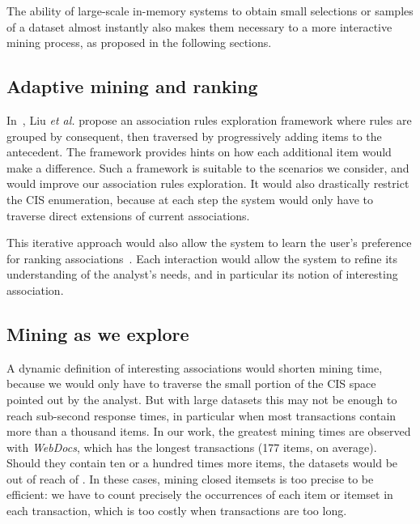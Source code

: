 The ability of large-scale in-memory systems to obtain small selections or samples of a dataset
almost instantly also makes them necessary to a more interactive mining process,
as proposed in the following sections.



%



\subsection{Adaptive mining and ranking}
\label{sec:evolutions:adaptative}

In~\cite{LiuICDE11}, Liu \textit{et al.} propose an association rules exploration framework
where rules are grouped by consequent,
then traversed by progressively adding items to the antecedent.
The framework provides hints on how each additional item would make a difference.
Such a framework is suitable to the scenarios we consider,
and would improve our association rules exploration.
It would also drastically restrict the CIS enumeration,
because at each step the system would only have to traverse direct extensions of current associations.

This iterative approach would also allow the system to learn the user's preference for ranking associations~\cite{dzyubaIJAIT14}.
Each interaction would allow the system to refine its understanding of the analyst's needs,
and in particular its notion of interesting association.


\subsection{Mining as we explore}

A dynamic definition of interesting associations would shorten mining time,
because we would only have to traverse the small portion of the CIS space pointed out by the analyst.
But with large datasets this may not be enough to reach sub-second response times,
in particular when most transactions contain more than a thousand items.
In our work,
the greatest mining times are observed with {\em WebDocs},
which has the longest transactions (177 items, on average).
Should they contain ten or a hundred times more items,
the datasets would be out of reach of \toppi.
In these cases, mining closed itemsets is too precise to be efficient:
we have to count precisely the occurrences of each item or itemset in each transaction,
which is too costly when transactions are too long.

